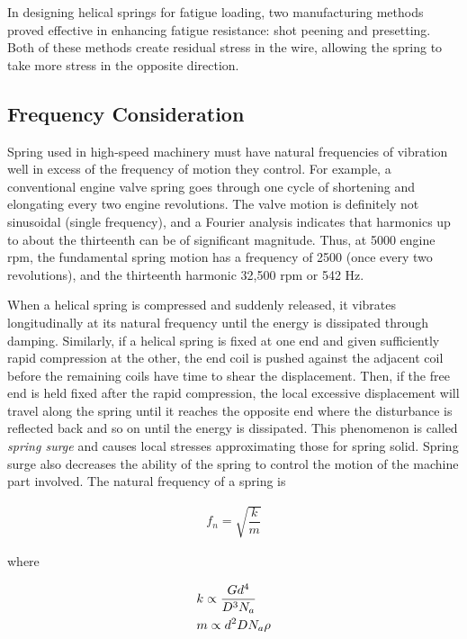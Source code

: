 \documentclass[a4paper,openany,12pt]{book}
\begin{document}
{{In designing helical springs for fatigue loading, two manufacturing
methods proved effective in enhancing fatigue resistance: shot peening
and presetting. Both of these methods create residual stress in the
wire, allowing the spring to take more stress in the opposite direction.

\subsection{Frequency Consideration}
\label{sec:orgb50d396}
Spring used in high-speed machinery must have natural frequencies of
vibration well in excess of the frequency of motion they control. For
example, a conventional engine valve spring goes through one cycle of
shortening and elongating every two engine revolutions. The valve motion
is definitely not sinusoidal (single frequency), and a Fourier analysis
indicates that harmonics up to about the thirteenth can be of
significant magnitude. Thus, at 5000 engine rpm, the fundamental spring
motion has a frequency of 2500 (once every two revolutions), and the
thirteenth harmonic 32,500 rpm or 542 Hz.

When a helical spring is compressed and suddenly released, it vibrates
longitudinally at its natural frequency until the energy is dissipated
through damping. Similarly, if a helical spring is fixed at one end and
given sufficiently rapid compression at the other, the end coil is
pushed against the adjacent coil before the remaining coils have time to
shear the displacement. Then, if the free end is held fixed after the
rapid compression, the local excessive displacement will travel along
the spring until it reaches the opposite end where the disturbance is
reflected back and so on until the energy is dissipated. This phenomenon
is called \emph{spring surge} and causes local stresses approximating those
for spring solid. Spring surge also decreases the ability of the spring
to control the motion of the machine part involved. The natural
frequency of a spring is

$$\begin{gathered}
    f_n = \sqrt {\dfrac{k}{m}}
  \end{gathered}$$

where

$$\begin{gathered}
    k \propto \frac{Gd^4}{D^3N_a} \hfill \\
    m \propto d^2DN_a\rho  \hfill
\end{gathered}$$

}}
\end{document}
